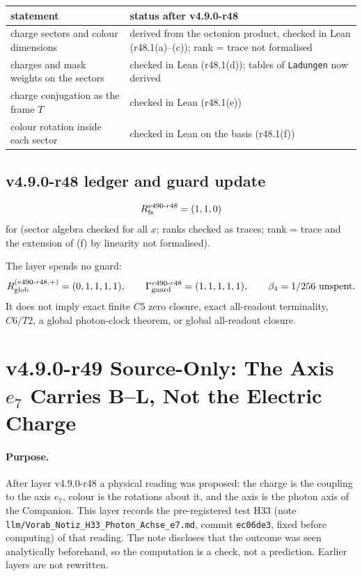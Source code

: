 \begin{center}
\small
\begin{tabular}{@{}>{\raggedright\arraybackslash}p{}>{\raggedright\arraybackslash}p{}@{}}
\toprule
statement & status after v4.9.0-r48\\
\midrule
charge sectors and colour dimensions & derived from the octonion product, checked in Lean (r48.1(a)--(c)); rank = trace not formalised\\
charges and mask weights on the sectors & checked in Lean (r48.1(d)); tables of \texttt{Ladungen} now derived\\
charge conjugation as the frame \(T\) & checked in Lean (r48.1(e))\\
colour rotation inside each sector & checked in Lean on the basis (r48.1(f))\\
\bottomrule
\end{tabular}
\end{center}

\subsection*{v4.9.0-r48 ledger and guard update}
\label{subsec:v490-r48-ledger-guard}

\[
R_{\rm fs}^{v490\text{-}r48}=(1,1,0)
\]
for (sector algebra checked for all \(x\); ranks checked as traces; rank = trace and the extension of (f) by linearity not formalised).

The layer spends no guard:
\[
R_{\rm glob}^{(v490\text{-}r48,+)}=(0,1,1,1,1),
\qquad
\Gamma_{\rm guard}^{v490\text{-}r48}=(1,1,1,1,1),
\qquad
\beta_4=1/256\ \text{unspent}.
\]
It does not imply exact finite \(C5\) zero closure, exact all-readout terminality,
\(C6/T2\), a global photon-clock theorem, or global all-readout closure.

\clearpage
\section*{v4.9.0-r49 Source-Only: The Axis \texorpdfstring{\(e_7\)}{e7} Carries B--L, Not the Electric Charge}
\label{sec:v490-r49-e7-axis-b-minus-l}

\paragraph{Purpose.}
After layer v4.9.0-r48 a physical reading was proposed: the charge is the coupling to the axis \(e_7\), colour is the rotations about it, and
the axis is the photon axis of the Companion.  This layer records the pre-registered test H33 (note
\texttt{llm/Vorab\_Notiz\_H33\_Photon\_Achse\_e7.md}, commit \texttt{ec06de3}, fixed before computing) of that reading.  The note discloses that the
outcome was seen analytically beforehand, so the computation is a check, not a prediction.  Earlier layers are not rewritten.

